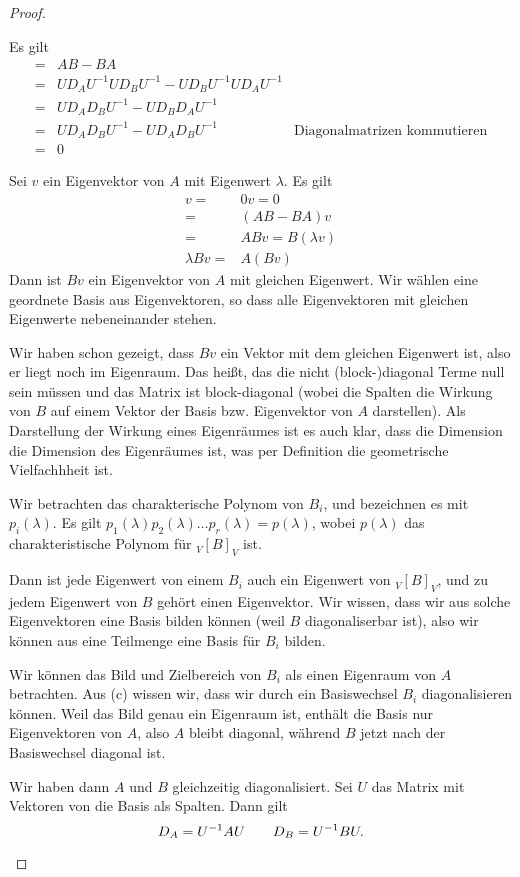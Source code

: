 \begin{proof}
	\begin{parts}
	\item Es gilt
		\begin{align*}
			[A,B]=&AB-BA\\
			=&UD_AU^{-1}UD_BU^{-1}-UD_BU^{-1}UD_AU^{-1}\\
			=&UD_AD_BU^{-1}-UD_BD_AU^{-1}\\
			=&UD_AD_BU^{-1}-UD_AD_BU^{-1} & \text{Diagonalmatrizen kommutieren}\\
			=&0
		\end{align*}
	\item Sei $v$ ein Eigenvektor von $A$ mit Eigenwert $\lambda$. Es gilt
		\begin{align*}
			[A,B]v=&0v=0\\
			=&(AB-BA)v\\
			=&ABv=B(\lambda v)\\
			\lambda Bv=&A(Bv)
		\end{align*}
		Dann ist $Bv$ ein Eigenvektor von $A$ mit gleichen Eigenwert. Wir wählen eine geordnete Basis aus Eigenvektoren, so dass alle Eigenvektoren mit gleichen Eigenwerte nebeneinander stehen. 

		Wir haben schon gezeigt, dass $B v$ ein Vektor mit dem gleichen Eigenwert ist, also er liegt noch im Eigenraum. Das heißt, das die nicht (block-)diagonal Terme null sein müssen und das Matrix ist block-diagonal (wobei die Spalten die Wirkung von $B$ auf einem Vektor der Basis bzw. Eigenvektor von $A$ darstellen). Als Darstellung der Wirkung eines Eigenräumes ist es auch klar, dass die Dimension die Dimension des Eigenräumes ist, was per Definition die geometrische Vielfachhheit ist.
	\item Wir betrachten das charakterische Polynom von $B_i$, und bezeichnen es mit $p_i(\lambda)$. Es gilt $p_1(\lambda)p_2(\lambda)\dots p_r(\lambda)=p(\lambda)$, wobei $p(\lambda)$ das charakteristische Polynom f\"{u}r $_V[B]_V$ ist.
		
		Dann ist jede Eigenwert von einem $B_i$ auch ein Eigenwert von $_V[B]_V$, und zu jedem Eigenwert von $B$ gehört einen Eigenvektor. Wir wissen, dass wir aus solche Eigenvektoren eine Basis bilden können (weil $B$ diagonaliserbar ist), also wir können aus eine Teilmenge eine Basis f\"{u}r $B_i$ bilden.
	\item Wir können das Bild und Zielbereich von $B_i$ als einen Eigenraum von $A$ betrachten. Aus (c) wissen wir, dass wir durch ein Basiswechsel $B_i$ diagonalisieren können. Weil das Bild genau ein Eigenraum ist, enthält die Basis nur Eigenvektoren von $A$, also $A$ bleibt diagonal, während $B$ jetzt nach der Basiswechsel diagonal ist. 

		Wir haben dann $A$ und $B$ gleichzeitig diagonalisiert. Sei $U$ das Matrix mit Vektoren von die Basis als Spalten. Dann gilt
\[
	D_A=U^{-1}AU\qquad D_B=U^{-1}BU
.\qedhere\] 
	\end{parts}
\end{proof}
